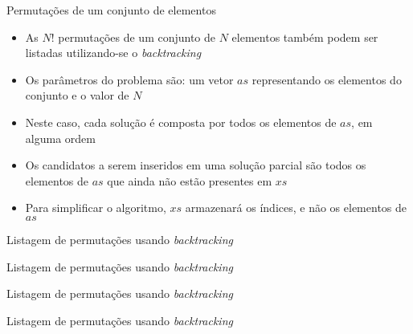 \begin{frame}[fragile]{Permutações de um conjunto de elementos}

    \begin{itemize}
        \item As $N!$ permutações de um conjunto de $N$ elementos também podem ser
            listadas utilizando-se o \textit{backtracking}

        \item Os parâmetros do problema são: um vetor $as$ representando os elementos do
            conjunto e o valor de $N$

        \item Neste caso, cada solução é composta por todos os elementos de $as$, em alguma ordem

        \item Os candidatos a serem inseridos em uma solução parcial são todos os elementos de
            $as$ que ainda não estão presentes em $xs$

        \item Para simplificar o algoritmo, $xs$ armazenará os índices, e não os elementos de
            $as$
    \end{itemize}

\end{frame}

\begin{frame}[fragile]{Listagem de permutações usando {\it backtracking}}
\end{frame}

\begin{frame}[fragile]{Listagem de permutações usando {\it backtracking}}
\end{frame}

\begin{frame}[fragile]{Listagem de permutações usando {\it backtracking}}
\end{frame}

\begin{frame}[fragile]{Listagem de permutações usando {\it backtracking}}
\end{frame}

